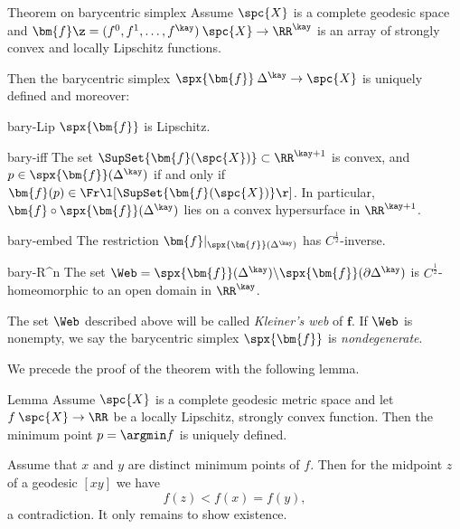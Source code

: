 \begin{thm}{Theorem on barycentric simplex}\label{thm:bary}
Assume $\spc{X}$ is a complete geodesic space and 
$\bm{f}\z=(f^0,f^1,\dots,f^\kay)\:\spc{X}\to\RR^\kay$ is an array of strongly convex and locally Lipschitz functions.

Then the barycentric simplex $\spx{\bm{f}}\:\Delta^\kay\to \spc{X}$
is uniquely defined and moreover:

\begin{subthm}{bary-Lip} $\spx{\bm{f}}$ is Lipschitz. %
\end{subthm}

\begin{subthm}{bary-iff} The set $\SupSet{\bm{f}(\spc{X})}\subset\RR^{\kay+1}$ is convex,
and
$p\in \spx{\bm{f}}(\Delta^\kay)$ if and only if
$\bm{f}(p)\in\Fr\l[\SupSet{\bm{f}(\spc{X})}\r]$.
In particular, $\bm{f}\circ\spx{\bm{f}}(\Delta^\kay)$ lies on a convex hypersurface in $\RR^{\kay+1}$.
\end{subthm}

\begin{subthm}{bary-embed} The restriction $\bm{f}|_{\spx{\bm{f}}(\Delta^\kay)}$  has  $C^{\frac{1}{2}}$-inverse.
\end{subthm}

\begin{subthm}{bary-R^n} 
The set $\Web=\spx{\bm{f}}(\Delta^\kay)\backslash\spx{\bm{f}}(\partial\Delta^\kay)$
is $C^{\frac{1}{2}}$-homeomorphic to an open domain in $\RR^\kay$.
\end{subthm}
\end{thm}

The set $\Web$ described above will be called \emph{Kleiner's web} of $\bm{f}$.
If $\Web$ is nonempty, we say the barycentric simplex $\spx{\bm{f}}$ is \emph{nondegenerate}.

We precede the proof of the theorem with the following lemma.

\begin{thm}{Lemma}\label{lem:argmin(convex)}
Assume $\spc{X}$ is a complete geodesic metric space and let  $f\:\spc{X}\to\RR$ be a locally Lipschitz, strongly convex function.  Then the minimum point 
$p=\argmin f$ 
is uniquely defined.
\end{thm}

Assume that $x$ and $y$ are distinct minimum points of $f$. 
Then for the midpoint $z$ of a geodesic $[x y]$ we have
$$f(z)<f(x)=f(y),$$ 
a contradiction. 
It only remains to show existence.

